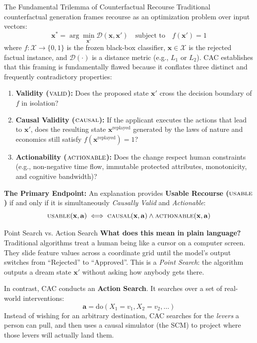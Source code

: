 \documentclass[11pt,a4paper]{article}
\newcommand{\Valid}{\textsc{valid}}
\newcommand{\Causal}{\textsc{causal}}
\newcommand{\Action}{\textsc{actionable}}
\newcommand{\Usable}{\textsc{usable}}
\begin{document}
\begin{parentconcept}{The Fundamental Trilemma of Counterfactual Recourse}
Traditional counterfactual generation frames recourse as an optimization problem over input vectors:
\begin{equation}
\mathbf{x}^* = \arg\min_{\mathbf{x}'} \mathcal{D}(\mathbf{x}, \mathbf{x}') \quad \text{subject to} \quad f(\mathbf{x}') = 1
\end{equation}
where $f: \mathcal{X} \to \{0, 1\}$ is the frozen black-box classifier, $\mathbf{x} \in \mathcal{X}$ is the rejected factual instance, and $\mathcal{D}(\cdot)$ is a distance metric (e.g., $L_1$ or $L_2$). CAC establishes that this framing is fundamentally flawed because it conflates three distinct and frequently contradictory properties:
\begin{enumerate}[leftmargin=1.5em]
    \item \textbf{Validity ($\Valid$):} Does the proposed state $\mathbf{x}'$ cross the decision boundary of $f$ in isolation?
    \item \textbf{Causal Validity ($\Causal$):} If the applicant executes the actions that lead to $\mathbf{x}'$, does the resulting state $\mathbf{x}^{\text{replayed}}$ generated by the laws of nature and economics still satisfy $f(\mathbf{x}^{\text{replayed}}) = 1$?
    \item \textbf{Actionability ($\Action$):} Does the change respect human constraints (e.g., non-negative time flow, immutable protected attributes, monotonicity, and cognitive bandwidth)?
\end{enumerate}
\textbf{The Primary Endpoint:} An explanation provides \textbf{Usable Recourse ($\Usable$)} if and only if it is simultaneously \emph{Causally Valid} and \emph{Actionable}:
\begin{equation}
\Usable(\mathbf{x}, \mathbf{a}) \iff \Causal(\mathbf{x}, \mathbf{a}) \land \Action(\mathbf{x}, \mathbf{a})
\end{equation}
\end{parentconcept}

\begin{childbranch}{Point Search vs. Action Search}
\textbf{What does this mean in plain language?}
Traditional algorithms treat a human being like a cursor on a computer screen. They slide feature values across a coordinate grid until the model's output switches from ``Rejected'' to ``Approved''. This is a \emph{Point Search}: the algorithm outputs a dream state $\mathbf{x}'$ without asking how anybody gets there.

\medskip\noindent
In contrast, CAC conducts an \textbf{Action Search}. It searches over a set of real-world interventions:
\begin{equation}
\mathbf{a} = \mathrm{do}(X_1 = v_1, X_2 = v_2, \dots)
\end{equation}
Instead of wishing for an arbitrary destination, CAC searches for the \emph{levers} a person can pull, and then uses a causal simulator (the SCM) to project where those levers will actually land them.
\end{childbranch}
\end{document}

